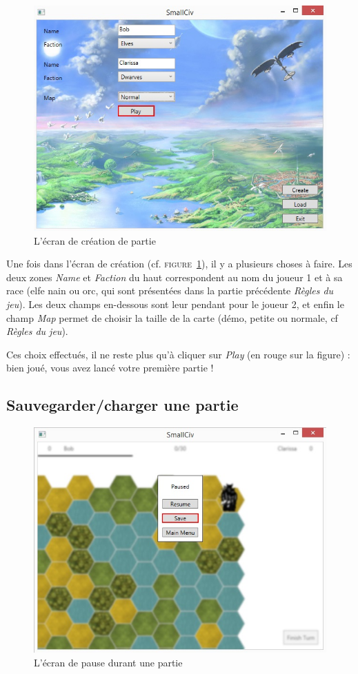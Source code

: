 \begin{figure}[h]
	\centering
	\includegraphics{img/creation.jpg}
	\caption{L'écran de création de partie}
	\label{creation}
\end{figure}
Une fois dans l'écran de création (cf. \textsc{figure~\ref{creation}}), il y a plusieurs choses à faire. Les deux zones \emph{Name} et \emph{Faction} du haut correspondent au nom du joueur 1 et à sa race (elfe nain ou orc, qui sont présentées dans la partie précédente \emph{Règles du jeu}). Les deux champs en-dessous sont leur pendant pour le joueur 2, et enfin le champ \emph{Map} permet de choisir la taille de la carte (démo, petite ou normale, cf \emph{Règles du jeu}).\newline

Ces choix effectués, il ne reste plus qu'à cliquer sur \emph{Play} (en rouge sur la figure) : bien joué, vous avez lancé votre première partie ! 

\subsection{Sauvegarder/charger une partie}
\begin{figure}[h]
	\centering
	\includegraphics{img/pause_to_save.jpg}
	\caption{L'écran de pause durant une partie}
	\label{pause}
\end{figure}

